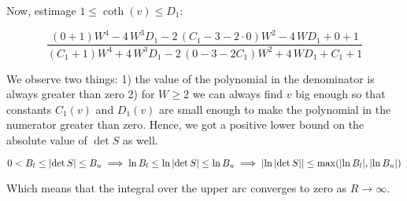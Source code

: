 Now, estimage $1 \le \coth(v) \le D_1$:

\[
\frac
{{\left(0   + 1\right)} W^{4} - 4 \, W^{3} D_1 - 2 \, {\left(C_1 - 3 - 2 \cdot 0  \right)} W^{2} - 4 \, W D_1 + 0   + 1}
{{\left(C_1 + 1\right)} W^{4} + 4 \, W^{3} D_1 - 2 \, {\left(0   - 3 - 2       C_1\right)} W^{2} + 4 \, W D_1 + C_1 + 1}
\]

We observe two things: 1) the value of the polynomial in the denominator is always greater than zero
2) for $W \ge 2$ we can always find $v$ big enough so that constants $C_1(v)$ and $D_1(v)$ are small enough to make the polynomial in the numerator greater than zero. Hence, we got a positive lower bound on the absolute value of $\det S$ as well. 

\[
0 < B_l \le \abs{\det S} \le B_u \implies \ln B_l \le \ln \abs{\det S} \le \ln B_u \implies \abs{\ln \abs{\det S}} \le \max(\abs{\ln B_l}, \abs{\ln B_u})
\]

Which means that the integral over the upper arc converges to zero as $R \to \infty$.



